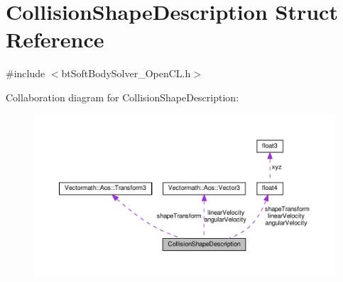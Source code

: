 \hypertarget{structCollisionShapeDescription}{}\section{Collision\+Shape\+Description Struct Reference}
\label{structCollisionShapeDescription}


{\ttfamily \#include $<$bt\+Soft\+Body\+Solver\+\_\+\+Open\+C\+L.\+h$>$}



Collaboration diagram for Collision\+Shape\+Description\+:
\nopagebreak
\begin{figure}[H]
\begin{center}
\leavevmode
\includegraphics[width=350pt]{structCollisionShapeDescription__coll__graph}
\end{center}
\end{figure}
